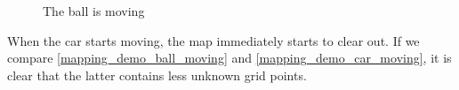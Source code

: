 \begin{figure}[!ht]
    \centering
    \caption{The ball is moving}
    \label{mapping_demo_ball_moving}
\end{figure}

When the car starts moving, the map immediately starts to clear out. If we compare \autoref{mapping_demo_ball_moving} and \autoref{mapping_demo_car_moving}, it is clear that the latter contains less unknown grid points.

